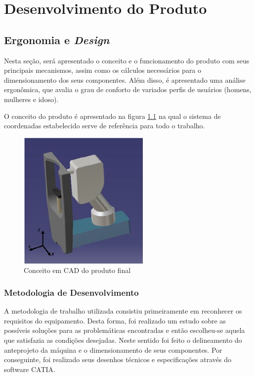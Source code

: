 \chapter[Desenvolvimento do Produto]{Desenvolvimento do Produto}

\section[Ergonomia e Design]{Ergonomia e \textit{Design}}

Nesta seção, será apresentado o conceito e o funcionamento do produto com seus principais mecanismos, assim como os cálculos necessários para o dimensionamento dos seus componentes. Além disso, é apresentado uma análise ergonômica, que avalia o grau de conforto de variados perfis de usuários (homens, mulheres e idoso).

O conceito do produto é apresentado na figura \ref{conceito} na qual o sistema de coordenadas estabelecido serve de referência para todo o trabalho.


\begin{figure}[htb]
		\centering
			\includegraphics[scale=1.0]{figuras/conceito.png}
		\caption{Conceito em CAD do produto final}
		\label{conceito}
\end{figure}

\subsection[Metodologia de Desenvolvimento]{Metodologia de Desenvolvimento}

A metodologia de trabalho utilizada consistiu primeiramente em reconhecer os requisitos do equipamento. Desta forma, foi realizado um estudo sobre as possíveis soluções para as problemáticas encontradas e então escolheu-se aquela que satisfazia as condições desejadas. Neste sentido foi feito o delineamento do anteprojeto da máquina e o dimensionamento de seus componentes. Por conseguinte, foi realizado seus desenhos técnicos e especificações através do software CATIA.

